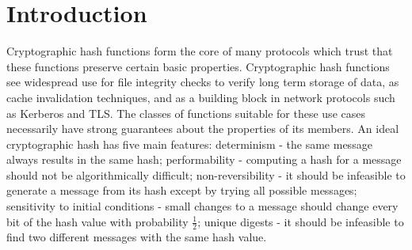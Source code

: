 \documentclass[conference]{IEEEtran}
\begin{document}




\maketitle

\begin{abstract}
The discovery of fast collision attacks in cryptographic hash functions has
traditionally resulted in the immediate deprecation of that hash function.
In this paper we propose five scalable and practical metrics for evaluating
the utility of collision classes based on boolean constraints and show that
the published attacks by X. Wang, Y. Sasaki, P. Kasselman, H. Dobbertin, and
M. Schl{\"a}ffer in MD4 have high utility. We expand on existing attacks by
developing a series of techniques based on logical cryptanalysis to find
over 35,000 collisions in MD4 based on existing collisions, through the novel
definition of a collision neighborhood. We demonstrate new techniques for
inductively building full collisions from reduced round variants of MD4. We
propose these techniques as a mechanism for measuring hash trustworthiness and
discuss potential applications to real-world systems.
\end{abstract}

%
\IEEEpeerreviewmaketitle

\section{Introduction}

Cryptographic hash functions form the core of many protocols which
trust that these functions preserve certain basic
properties. Cryptographic hash functions see widespread
use for file integrity checks to verify long term storage of
data, as cache invalidation techniques, and as a building block in network
protocols such as Kerberos and TLS.  The classes of functions suitable
for these use cases necessarily have
strong guarantees about the properties of its members.
An ideal cryptographic hash has five main features: determinism - the
same message always results in the same hash; performability -
computing a hash for a message should not be algorithmically
difficult; non-reversibility - it should be infeasible to generate a message
from its hash except by trying all possible messages; sensitivity to
initial conditions - small changes to a message should change every bit of
the hash value with probability $\frac{1}{2}$;
unique digests - it should be infeasible to find two different messages with
the same hash value.
\end{document}
